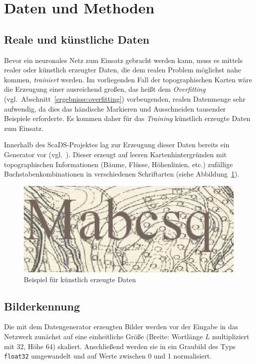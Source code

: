 \section{Daten und Methoden}
\label{daten}

\subsection{Reale und künstliche Daten}
\label{daten:daten}

Bevor ein neuronales Netz zum Einsatz gebracht werden kann, muss es mittels realer oder künstlich erzeugter Daten, die
dem realen Problem möglichst nahe kommen, \textit{trainiert} werden. Im vorliegenden Fall der topographischen Karten
wäre die Erzeugung einer ausreichend großen, das heißt dem \textit{Overfitting}
(vgl.\ Abschnitt~\ref{ergebnisse:overfitting}) vorbeugenden, realen Datenmenge sehr aufwendig, da dies das händische
Markieren und Ausschneiden tausender Beispiele erforderte. Es kommen daher für das \textit{Training} künstlich erzeugte
Daten zum Einsatz.

Innerhalb des ScaDS-Projektes lag zur Erzeugung dieser Daten bereits ein Generator vor (vgl.~\cite{schoelzel17}). Dieser
erzeugt auf leeren Kartenhintergründen mit topographischen Informationen (Bäume, Flüsse, Höhenlinien, etc.) zufällige
Buchstabenkombinationen in verschiedenen Schriftarten (siehe Abbildung~\ref{daten:daten:beispiele}).

\begin{figure}
    \centering
    \includegraphics[width = 0.9\linewidth]{img/Mabcsq.jpg}
    \caption{Beispiel für künstlich erzeugte Daten\label{daten:daten:beispiele}}
\end{figure}

\subsection{Bilderkennung}
\label{daten:bilderkennung}

Die mit dem Datengenerator erzeugten Bilder werden vor der Eingabe in das Netzwerk zunächst auf eine einheitliche
Größe (Breite: Wortlänge $L$ multipliziert mit 32, Höhe 64) skaliert. Anschließend werden sie in ein Graubild des
Typs \texttt{float32} umgewandelt und auf Werte zwischen 0 und 1 normalisiert.


